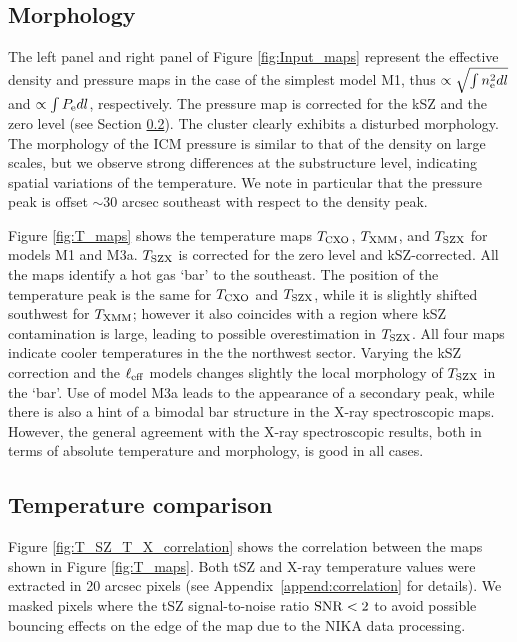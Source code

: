 \documentclass[twocolumn,traditabstract]{aa}
\def\xe {n_{\rm e}}
\def\pe {P_{\rm e}}
\def\TSZ {T_{\rm SZX}}
\def \TXC {T_{\rm CXO}}
\def \TXX {T_{\rm XMM}}
\begin{document}
\subsection{Morphology}
The left panel and right panel of Figure \ref{fig:Input_maps} represent the effective density and pressure maps in the case of the simplest model M1, thus $\propto \sqrt{\int\xe^2 dl}$ and $\propto \int \pe dl$, respectively. The pressure map is corrected for the kSZ and the zero level (see Section \ref{sec:compT}). The cluster clearly exhibits a disturbed morphology. The morphology of the ICM pressure is similar to that of the density on large scales, but we observe strong differences at the substructure level, indicating spatial variations of the temperature. We note in particular that the pressure peak is offset $\sim 30$ arcsec southeast with respect to the density peak.

Figure \ref{fig:T_maps} shows the temperature maps ${T}_{\rm CXO}$, ${T}_{\rm XMM}$, and $\TSZ$ for models M1 and M3a. $\TSZ$ is corrected for the zero level and kSZ-corrected. All the maps identify a hot gas `bar' to the southeast. The position of the temperature peak is the same for $\TXC$ and $\TSZ$, while it is slightly shifted southwest for $\TXX$; however it also coincides with a region where kSZ contamination is large, leading to possible overestimation in $\TSZ$. All four maps indicate cooler temperatures in the the northwest sector. Varying the kSZ correction and the $\ell_{\rm eff}$ models changes slightly the local morphology of $\TSZ$ in the `bar'. Use of model M3a leads to the appearance of a secondary peak, while there is also a hint of a bimodal bar structure in the X-ray spectroscopic maps. However, the general agreement with the X-ray spectroscopic results, both in terms of absolute temperature and morphology, is good in all cases. 

\subsection{Temperature comparison}\label{sec:compT}
Figure \ref{fig:T_SZ_T_X_correlation} shows the correlation between the maps shown in Figure \ref{fig:T_maps}. Both tSZ and X-ray temperature values were extracted in 20 arcsec pixels (see Appendix~\ref{append:correlation} for details). We masked pixels where the tSZ signal-to-noise ratio ${\rm SNR < 2}$ to avoid possible bouncing effects on the edge of the map due to the NIKA data processing.
\end{document}

